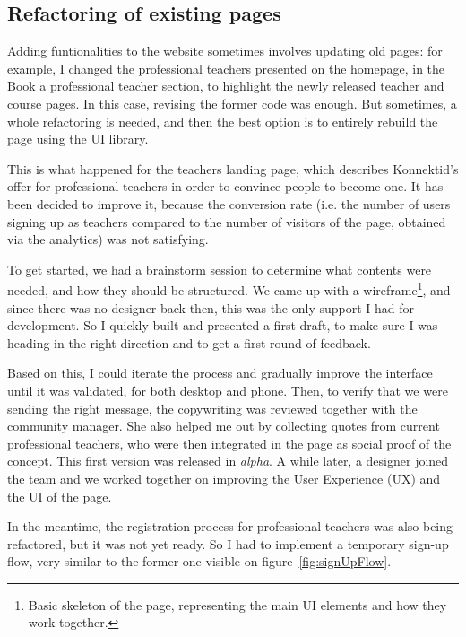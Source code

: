 \subsection{Refactoring of existing pages}
\label{ssec:refactor}

Adding funtionalities to the website sometimes involves updating old pages: for example, I changed the professional teachers presented on the homepage, in the \guillemotleft{} Book a professional teacher \guillemotright{} section, to highlight the newly released teacher and course pages. In this case, revising the former code was enough. But sometimes, a whole refactoring is needed, and then the best option is to entirely rebuild the page using the UI library.

This is what happened for the teachers landing page, which describes Konnektid's offer for professional teachers in order to convince people to become one. It has been decided to improve it, because the conversion rate (i.e. the number of users signing up as teachers compared to the number of visitors of the page, obtained via the analytics) was not satisfying.

To get started, we had a brainstorm session to determine what contents were needed, and how they should be structured. We came up with a wireframe\footnote{Basic skeleton of the page, representing the main UI elements and how they work together.}, and since there was no designer back then, this was the only support I had for development. So I quickly built and presented a first draft, to make sure I was heading in the right direction and to get a first round of feedback.

Based on this, I could iterate the process and gradually improve the interface until it was validated, for both desktop and phone. Then, to verify that we were sending the right message, the copywriting was reviewed together with the community manager. She also helped me out by collecting quotes from current professional teachers, who were then integrated in the page as social proof of the concept. This first version was released in \textit{alpha}. A while later, a designer joined the team and we worked together on improving the User Experience (UX) and the UI of the page.

In the meantime, the registration process for professional teachers was also being refactored, but it was not yet ready. So I had to implement a temporary sign-up flow, very similar to the former one visible on {\sc figure}~\ref{fig:signUpFlow}.

